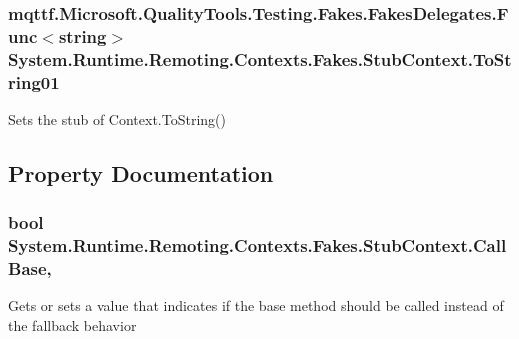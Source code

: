 \hypertarget{class_system_1_1_runtime_1_1_remoting_1_1_contexts_1_1_fakes_1_1_stub_context_ab3ec54191b2211d997d7e57636bd24d4}{
\subsubsection[{To\-String01}]{\setlength{\rightskip}{0pt plus 5cm}mqttf.\-Microsoft.\-Quality\-Tools.\-Testing.\-Fakes.\-Fakes\-Delegates.\-Func$<$string$>$ System.\-Runtime.\-Remoting.\-Contexts.\-Fakes.\-Stub\-Context.\-To\-String01}}\label{class_system_1_1_runtime_1_1_remoting_1_1_contexts_1_1_fakes_1_1_stub_context_ab3ec54191b2211d997d7e57636bd24d4}


Sets the stub of Context.\-To\-String()



\subsection{Property Documentation}
\hypertarget{class_system_1_1_runtime_1_1_remoting_1_1_contexts_1_1_fakes_1_1_stub_context_ab24f535578fd2acb010bfefa86dfd3ec}{
\subsubsection[{Call\-Base}]{\setlength{\rightskip}{0pt plus 5cm}bool System.\-Runtime.\-Remoting.\-Contexts.\-Fakes.\-Stub\-Context.\-Call\-Base\hspace{0.3cm}{\ttfamily [get]}, {\ttfamily [set]}}}\label{class_system_1_1_runtime_1_1_remoting_1_1_contexts_1_1_fakes_1_1_stub_context_ab24f535578fd2acb010bfefa86dfd3ec}


Gets or sets a value that indicates if the base method should be called instead of the fallback behavior

